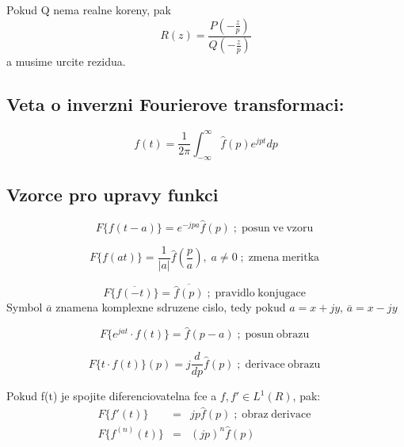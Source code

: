 Pokud Q nema realne koreny, pak
\begin{equation}
\label{eq:rac_imag}
R(z)=\frac{P(-\frac{z}{p})}{	Q(-\frac{z}{p})}
\end{equation} 
a musime urcite rezidua.

\subsection*{Veta o inverzni Fourierove transformaci:}
\begin{equation}
\label{eq:invF}
f(t) = \frac{1}{2\pi}\int_{-\infty}^{\infty} \hat{f}(p)e^{jpt}dp
\end{equation}

\subsection*{Vzorce pro upravy funkci}

\begin{equation}
\label{eq:p_vzoru}
F\{f(t-a)\} = e^{-jpa} \hat{f}(p) \; ; \operatorname{posun\; ve \; vzoru}
\end{equation}

\begin{equation}
\label{eq:zm_meritka}
F\{f(at)\} = \frac{1}{|a|}\hat{f}\left(\frac{p}{a}\right), \; a \neq 0 \; ; \operatorname{zmena \; meritka}
\end{equation}

\begin{equation}
\label{eq:konjug}
F\{\overline{f(-t)}\} = \overline{\hat{f}(p)}\; ; \operatorname{pravidlo \; konjugace}
\end{equation}
Symbol $\overline{a}$ znamena komplexne sdruzene cislo, tedy pokud $a=x+jy$, $\overline{a}=x-jy$

\begin{equation}
\label{eq:p_obrazu}
F\{e^{jat}\cdot f(t) \} = \hat{f}(p-a) \; ; \operatorname{posun \; obrazu}
\end{equation}

\begin{equation}
\label{eq:der_obr}
F\{t\cdot f(t)\}(p) = j\frac{d}{dp}\hat{f}(p) \; ; \operatorname{derivace \; obrazu}
\end{equation}

Pokud f(t) je spojite diferenciovatelna fce a $f, f' \in L^1(R)$, pak:
\begin{equation}
\label{eq:obr_derivace}
\begin{array}{rcl}
F\{ f'(t)\} & = & jp\hat{f}(p)\; ; \operatorname{obraz \; derivace}\\
F\{ f^{(n)}(t) \} & = & (jp)^n \hat{f}(p)\\
\end{array}
\end{equation} 

